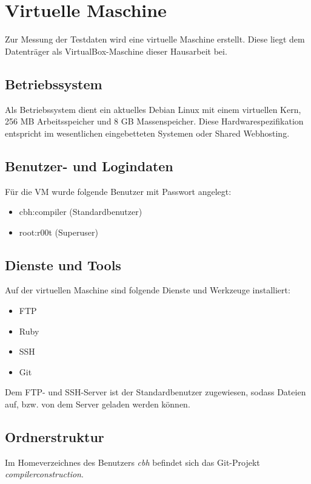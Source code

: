 \thispagestyle{empty}
\section*{Virtuelle Maschine}
Zur Messung der Testdaten wird eine virtuelle Maschine erstellt. Diese liegt dem Datenträger als VirtualBox-Maschine dieser Hausarbeit bei. 

\subsection*{Betriebssystem}
Als Betriebssystem dient ein aktuelles Debian Linux mit einem virtuellen Kern, 256 MB Arbeitsspeicher und 8 GB Massenspeicher. Diese Hardwarespezifikation entspricht im wesentlichen eingebetteten Systemen oder Shared Webhosting. 

\subsection*{Benutzer- und Logindaten}

Für die VM wurde folgende Benutzer mit Passwort angelegt:
\begin{itemize}
    \item{cbh:compiler (Standardbenutzer)}
    \item{root:r00t (Superuser)}
\end{itemize}

\subsection*{Dienste und Tools}

Auf der virtuellen Maschine sind folgende Dienste und Werkzeuge installiert: 

\begin{itemize}
    \item{FTP}
    \item{Ruby}
    \item{SSH}
    \item{Git}
\end{itemize}

Dem FTP- und SSH-Server ist der Standardbenutzer zugewiesen, sodass Dateien auf, bzw. von dem Server geladen werden können.

\subsection*{Ordnerstruktur}
Im Homeverzeichnes des Benutzers \textit{cbh} befindet sich das Git-Projekt \textit{compilerconstruction}.

